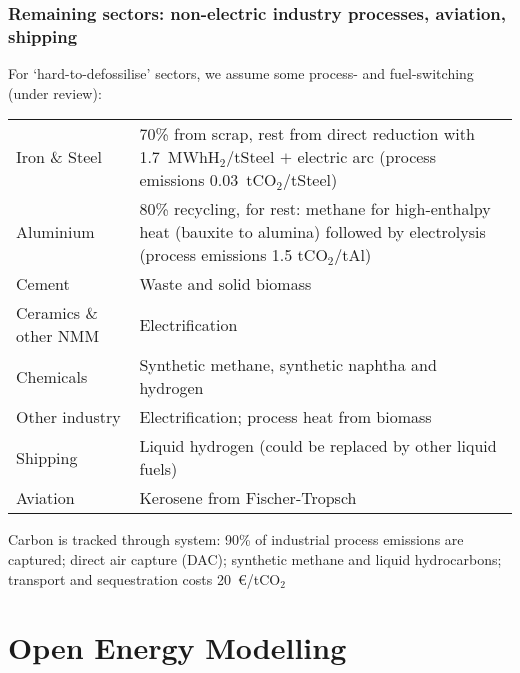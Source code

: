 \documentclass[10pt,aspectratio=169,dvipsnames]{beamer}
\begin{document}
\begin{frame}
  \frametitle{Remaining sectors: non-electric industry processes, aviation, shipping}

  For `hard-to-defossilise' sectors, we assume some process- and fuel-switching (under review):
    \begin{table}
\centering
\begin{tabular}{@{}lp{10cm}@{}}
  \toprule
  Iron \& Steel & 70\% from scrap, rest from direct reduction with 1.7~MWhH$_2$/tSteel $+$ electric arc (process emissions 0.03~tCO$_2$/tSteel)\\
  Aluminium & 80\% recycling, for rest: methane for high-enthalpy heat (bauxite to alumina) followed by electrolysis (process emissions 1.5 tCO$_2$/tAl) \\
  Cement &  Waste and solid biomass \\
  Ceramics \& other NMM &  Electrification\\
  Chemicals & Synthetic methane, synthetic naphtha and hydrogen \\
  Other industry & Electrification; process heat from biomass\\
  Shipping & Liquid hydrogen  (could be replaced by other liquid fuels) \\
  Aviation & Kerosene from Fischer-Tropsch  \\
  \bottomrule
\end{tabular}
\end{table}

 Carbon is tracked through system: 90\% of industrial process emissions are captured; direct air capture (DAC); synthetic methane and liquid hydrocarbons; transport and sequestration costs 20~\euro/tCO$_2$

\end{frame}


\section{Open Energy Modelling}
\end{document}

